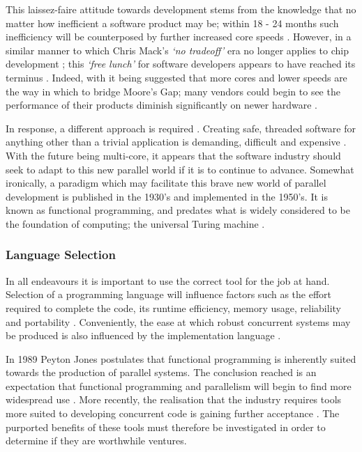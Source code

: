 \documentclass[12pt,a4paper]{article}
\begin{document}
This laissez-faire attitude towards development stems from the knowledge that no matter how inefficient a software product may be; within 18 - 24 months such inefficiency will be counterposed by further increased core speeds \cite{theFreeLunchIsOver}. However, in a similar manner to which Chris Mack's \textit{`no tradeoff'} era no longer applies to chip development \cite{fiftyYearsOfMoores}; this \textit{`free lunch'} for software developers appears to have reached its terminus \cite{theFreeLunchIsOver}. Indeed, with it being suggested that more cores and lower speeds are the way in which to bridge Moore's Gap; many vendors could begin to see the performance of their products diminish significantly on newer hardware \cite{theFreeLunchIsOver,concurrencyChallenges}.

In response, a different approach is required \cite{concurrencyChallenges}. Creating safe, threaded software for anything other than a trivial application is demanding, difficult and expensive \cite{concurrencyChallenges}. With the future being multi-core, it appears that the software industry should seek to adapt to this new parallel world if it is to continue to advance. Somewhat ironically, a paradigm which may facilitate this brave new world of parallel development is published in the 1930's and implemented in the 1950's. It is known as functional programming, and predates what is widely considered to be the foundation of computing; the universal Turing machine  \cite{historyOfLisp,churchTuringThesis,promisesOfFunctionalProgramming}.

\subsubsection{Language Selection}

In all endeavours it is important to use the correct tool for the job at hand. Selection of a programming language will influence factors such as the effort required to complete the code, its runtime efficiency, memory usage, reliability and portability \cite{languageComparison}. Conveniently, the ease at which robust concurrent systems may be produced is also influenced by the implementation language \cite{paraFuncImp,promisesOfFunctionalProgramming}.

In 1989 Peyton Jones \cite{paraFuncImp} postulates that functional programming is inherently suited towards the production of parallel systems. The conclusion reached is an expectation that functional programming and parallelism will begin to find more widespread use \cite{paraFuncImp}. More recently, the realisation that the industry requires tools more suited to developing concurrent code is gaining further acceptance \cite{promisesOfFunctionalProgramming}. The purported benefits of these tools must therefore be investigated in order to determine if they are worthwhile ventures.
\end{document}
